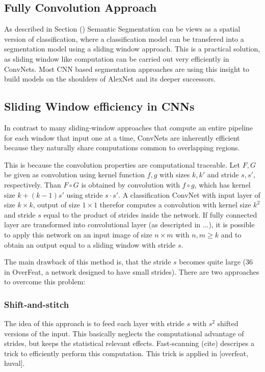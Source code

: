 \subsection{Fully Convolution Approach}

As described in Section () Semantic Segmentation can be views as a spatial version of classification, where a classification model can be transfered into a segmentation model using a sliding window approach. This is a practical solution, as sliding window like computation can be carried out very efficiently in ConvNets. Most CNN based segmentation approaches are using this insight to build models on the shoulders of AlexNet and its deeper successors. 

\subsection{Sliding Window efficiency in CNNs}


In contrast to many sliding-window approaches that compute an entire pipeline for each window that input one at a time, ConvNets are inherently efficient because they naturally share computations common to overlapping regions. 


This is because the convolution properties are computational traceable. Let $F, G$ be given as convolution using kernel function $f,g$ with sizes $k,k'$ and stride $s,s'$, respectively. Than $F \circ G$ is obtained by convolution with $f \circ g$, which has kernel size $k + (k-1) s'$ using stride $s \cdot s'$. A classification ConvNet with input layer of size $k \times k$, output of size $1 \times 1$ therefor computes a convolution with kernel size $k^2$ and stride $s$ equal to the product of strides inside the network. If fully connected layer are transformed into convolutional layer (as descripted in ...), it is possible to apply this network on an input image of size $n \times m$ with $n,m \geq k$ and to obtain an output equal to a sliding window with stride $s$. 

The main drawback of this method is, that the stride $s$ becomes quite large ($36$ in OverFeat, a network designed to have small strides). There are two approaches to overcome this problem:

\subsubsection{Shift-and-stitch} The idea of this approach is to feed each layer with stride $s$ with $s^2$ shifted versions of the input. This basically neglects the computational advantage of strides, but keeps the statistical relevant effects. Fast-scanning (cite) descripes a trick to efficiently perform this computation.  This trick is applied in [overfeat, huval].

